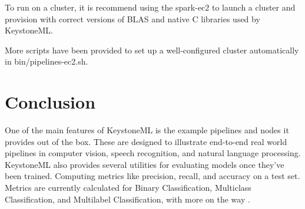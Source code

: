 \documentclass[9pt,twocolumn,twoside]{../../styles/osajnl}
\begin{document}
To run on a cluster, it is recommend using the spark-ec2 to launch a
cluster and provision with correct versions of BLAS and native C
libraries used by KeystoneML.

More scripts have been provided to set up a well-configured cluster
automatically in bin/pipelines-ec2.sh.


\section{Conclusion}

One of the main features of KeystoneML is the example pipelines and
nodes it provides out of the box. These are designed to illustrate
end-to-end real world pipelines in computer vision, speech
recognition, and natural language processing. KeystoneML also provides
several utilities for evaluating models once they’ve been
trained. Computing metrics like precision, recall, and accuracy on a
test set. Metrics are currently calculated for Binary Classification,
Multiclass Classification, and Multilabel Classification, with more on
the way \cite{www-keystoneml} .




\end{document}
